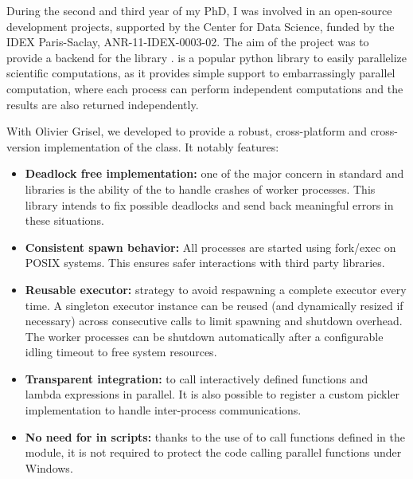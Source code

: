 \documentclass[../thesis.tex]{subfiles}
\begin{document}
During the second and third year of my PhD, I was involved in an open-source development projects, supported by the Center for Data Science, funded by the IDEX Paris-Saclay, ANR-11-IDEX-0003-02.	The aim of the project was to provide a backend for the library .  is a popular python library to easily parallelize scientific computations, as it provides simple support to embarrassingly parallel computation, where each process can perform independent computations and the results are also returned independently.

With Olivier Grisel, we developed  to provide a robust, cross-platform and cross-version implementation of the  class. It notably features:

\begin{itemize}
	\item \textbf{Deadlock free implementation:} one of the major concern in
	standard\linebreak[4] and  libraries is the
	ability of the\linebreak[4] to handle crashes of worker
	processes. This library intends to fix possible deadlocks and send back meaningful
	errors in these situations.

	\item \textbf{Consistent spawn behavior:} All processes are started using
	fork/exec on POSIX systems. This ensures safer interactions with
	third party libraries.

	\item \textbf{Reusable executor:} strategy to avoid respawning a complete
	executor every time. A singleton executor instance can be reused (and
	dynamically resized if necessary) across consecutive calls to limit
	spawning and shutdown overhead. The worker processes can be shutdown
	automatically after a configurable idling timeout to free system
	resources.

	\item \textbf{Transparent  integration:} to call interactively
	defined functions and lambda expressions in parallel. It is also
	possible to register a custom pickler implementation to handle
	inter-process communications.

	\item \textbf{No need for  in scripts:} thanks
	to the use of  to call functions defined in the
	 module, it is not required to protect the code calling
	parallel functions under Windows.

\end{itemize}
\end{document}
